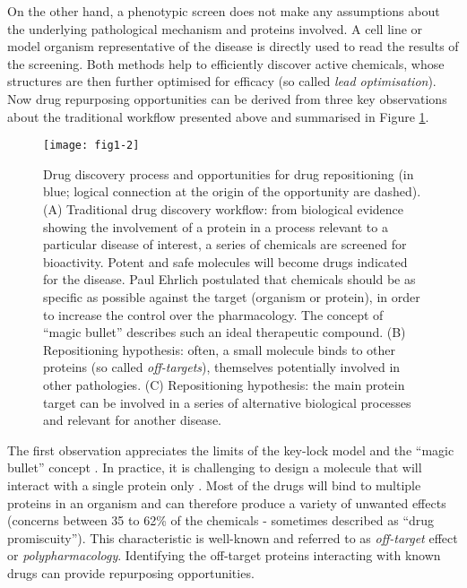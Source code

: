 On the other hand, a phenotypic screen does not make any assumptions about the underlying pathological mechanism and proteins involved. A cell line or model organism representative of the disease is directly used to read the results of the screening. Both methods help to efficiently discover active chemicals, whose structures are then further optimised for efficacy (so called \emph{lead optimisation}). Now drug repurposing opportunities can be derived from three key observations \citep{barratt2012drug} about the traditional workflow presented above and summarised in Figure \ref{fig1-2}.

\begin{figure}[ht]
    \centering
    \texttt{[image: fig1-2]}
    \caption{Drug discovery process and opportunities for drug repositioning (in blue; logical connection at the origin of the opportunity are dashed). (A) Traditional drug discovery workflow: from biological evidence showing the involvement of a protein in a process relevant to a particular disease of interest, a series of chemicals are screened for bioactivity. Potent and safe molecules will become drugs indicated for the disease. Paul Ehrlich postulated that chemicals should be as specific as possible against the target (organism or protein), in order to increase the control over the pharmacology. The concept of ``magic bullet'' describes such an ideal therapeutic compound. (B) Repositioning hypothesis: often, a small molecule binds to other proteins (so called \emph{off-targets}), themselves potentially involved in other pathologies. (C) Repositioning hypothesis: the main protein target can be involved in a series of alternative biological processes and relevant for another disease.}
    \label{fig1-2}
\end{figure}

The first observation appreciates the limits of the key-lock model and the ``magic bullet'' concept \citep{ehrlichwiki}. In practice, it is  challenging to design a molecule that will interact with a single protein only \citep{paolini2006global} \citep{li2010pubchem}. Most of the drugs will bind to multiple proteins in an organism and can therefore produce a variety of unwanted effects (concerns between 35 to 62\% of the chemicals - sometimes described as ``drug promiscuity''). This characteristic is well-known and referred to as \emph{off-target} effect or \emph{polypharmacology}. Identifying the off-target proteins interacting with known drugs can provide repurposing opportunities.

